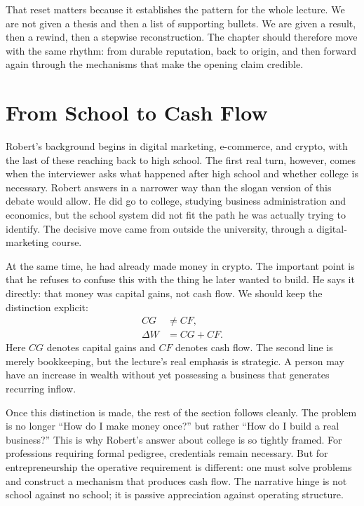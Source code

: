 That reset matters because it establishes the pattern for the whole lecture. We are not given a thesis and then a list of supporting bullets. We are given a result, then a rewind, then a stepwise reconstruction. The chapter should therefore move with the same rhythm: from durable reputation, back to origin, and then forward again through the mechanisms that make the opening claim credible.

\section{From School to Cash Flow}

Robert's background begins in digital marketing, e-commerce, and crypto, with the last of these reaching back to high school. The first real turn, however, comes when the interviewer asks what happened after high school and whether college is necessary. Robert answers in a narrower way than the slogan version of this debate would allow. He did go to college, studying business administration and economics, but the school system did not fit the path he was actually trying to identify. The decisive move came from outside the university, through a digital-marketing course.

At the same time, he had already made money in crypto. The important point is that he refuses to confuse this with the thing he later wanted to build. He says it directly: that money was capital gains, not cash flow. We should keep the distinction explicit:
\begin{align}
CG &\neq CF,\\
\Delta W &= CG + CF.
\end{align}
Here \(CG\) denotes capital gains and \(CF\) denotes cash flow. The second line is merely bookkeeping, but the lecture's real emphasis is strategic. A person may have an increase in wealth without yet possessing a business that generates recurring inflow.

Once this distinction is made, the rest of the section follows cleanly. The problem is no longer ``How do I make money once?'' but rather ``How do I build a real business?'' This is why Robert's answer about college is so tightly framed. For professions requiring formal pedigree, credentials remain necessary. But for entrepreneurship the operative requirement is different: one must solve problems and construct a mechanism that produces cash flow. The narrative hinge is not school against no school; it is passive appreciation against operating structure.

